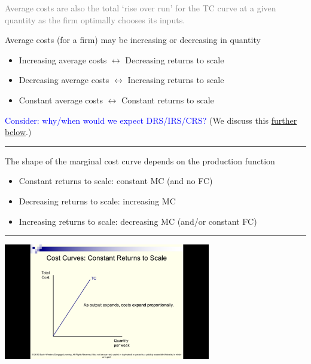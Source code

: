 \documentclass[]{article}
\begin{document}
\textcolor{gray}{Average costs are also the total ‘rise over run’ for the TC curve at a given quantity as the firm optimally chooses its inputs.}

Average costs (for a firm) may be increasing or decreasing in quantity

\bigskip

\begin{itemize}
\item
  Increasing average costs \(\leftrightarrow\) Decreasing returns to
  scale
\item
  Decreasing average costs \(\leftrightarrow\) Increasing returns to
  scale
\item
  Constant average costs \(\leftrightarrow\) Constant returns to scale
\end{itemize}

\bigskip

\textcolor{blue}{Consider: why/when would we expect DRS/IRS/CRS?} (We
discuss this \protect\hyperlink{ux5cux23IRS-DRS-reasons}{further
below}.)

\begin{center}\rule{0.5\linewidth}{\linethickness}\end{center}

The shape of the marginal cost curve depends on the production function

\begin{itemize}
\item
  Constant returns to scale: constant MC (and no FC)
\item
  Decreasing returns to scale: increasing MC
\item
  Increasing returns to scale: decreasing MC (and/or constant FC)
\end{itemize}

\begin{center}\rule{0.5\linewidth}{\linethickness}\end{center}

\includegraphics[height=2in]{picsfigs/crsTCcurve.png}
\end{document}
